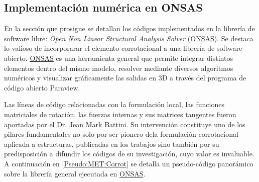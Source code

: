 \subsection{Implementación numérica en ONSAS}
En la sección que prosigue se detallan los códigos implementados en la librería de software libre: \emph{Open Non Linear Structural Analysis Solver} (\href{https://github.com/ONSAS/ONSAS/}{ONSAS}). Se destaca lo valioso de incorporarar el elemento corrotacional a una librería de software abierto. \href{https://github.com/ONSAS/ONSAS/}{ONSAS} es una herramienta general que permite integrar distintos elementos dentro del mismo modelo, resolver mediante diversos algoritmos numéricos y visualizar gráficamente las salidas en 3D a través del programa de código abierto Paraview.

Las líneas de código relacionadas con la formulación local, las funciones matriciales de rotación, las fuerzas internas y sus matrices tangentes fueron aportadas por el Dr. Jean Mark Battini. Su intervención constituye uno de los pilares fundamentales no solo por ser pionero dela formulación corrotacional aplicada a estructuras, publicadas en los trabajos \citep{Battini2002} \citep{Le2014} sino también por su predisposición a difundir los códigos de su investigación, cuyo valor es invaluable. A continuación en \ref{Pseudo:MET:Corrot} se detalla un pseudo-código panorámico sobre la librería general ejecutada en \href{https://github.com/ONSAS/ONSAS/}{ONSAS}. 

